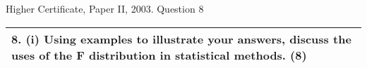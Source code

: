 \documentclass[a4paper,12pt]{article}
\begin{document}
Higher Certificate, Paper II, 2003. Question 8


\begin{table}[ht!]
 
\centering
 
\begin{tabular}{|p{15cm}|}
 
\hline  
8. (i) Using examples to illustrate your answers, discuss the uses of the F distribution in statistical methods. (8) 

\\ \hline
  
\end{tabular}

\end{table}





\end{document}
